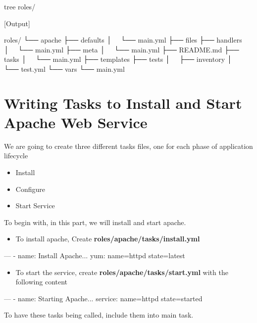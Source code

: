 \begin{code}
tree roles/
\end{code}

[Output]\newline
\begin{code}
roles/
  └── apache
      ├── defaults
      │   └── main.yml
      ├── files
      ├── handlers
      │   └── main.yml
      ├── meta
      │   └── main.yml
      ├── README.md
      ├── tasks
      │   └── main.yml
      ├── templates
      ├── tests
      │   ├── inventory
      │   └── test.yml
      └── vars
          └── main.yml
\end{code}

\section{Writing Tasks to Install and Start Apache Web Service}

We are going to create three different tasks files, one for each phase of application lifecycle

\begin{itemize}
\item Install
\item Configure
\item Start Service
\end{itemize}

To begin with, in this part, we will install and start apache.

\begin{itemize}
\item To install apache, Create \textbf{roles/apache/tasks/install.yml}
\end{itemize}

\begin{code}
---
- name: Install Apache...
  yum: name=httpd state=latest
\end{code}

\begin{itemize}
\item To start the service, create  \textbf{roles/apache/tasks/start.yml} with the following content
\end{itemize}

\begin{code}
---
- name: Starting Apache...
  service: name=httpd state=started
\end{code}

To have these tasks being called, include them into main task.

